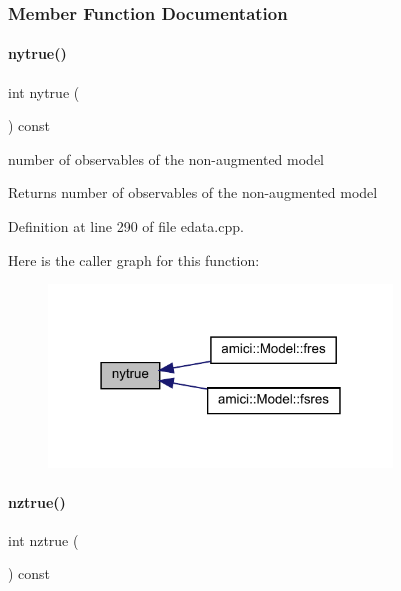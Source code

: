 \subsubsection{Member Function Documentation}
\mbox{\label{classamici_1_1_exp_data_ac2657ffc58ee1ea80d6c4db40010e942}} 
\paragraph{\texorpdfstring{nytrue()}{nytrue()}}
{\footnotesize\ttfamily int nytrue (\begin{DoxyParamCaption}{ }\end{DoxyParamCaption}) const}

number of observables of the non-\/augmented model

\begin{DoxyReturn}{Returns}
number of observables of the non-\/augmented model 
\end{DoxyReturn}


Definition at line 290 of file edata.\+cpp.

Here is the caller graph for this function\+:
\nopagebreak
\begin{figure}[H]
\begin{center}
\leavevmode
\includegraphics[width=259pt]{classamici_1_1_exp_data_ac2657ffc58ee1ea80d6c4db40010e942_icgraph}
\end{center}
\end{figure}
\mbox{\label{classamici_1_1_exp_data_a9e9b6341842d8860b0114faa4e0c97ee}} 
\paragraph{\texorpdfstring{nztrue()}{nztrue()}}
{\footnotesize\ttfamily int nztrue (\begin{DoxyParamCaption}{ }\end{DoxyParamCaption}) const}

